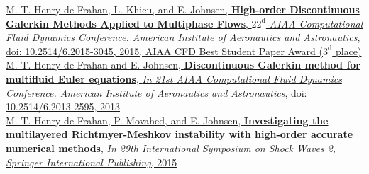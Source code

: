 \documentclass[11pt,letterpaper]{article}
\newcommand{\raisedrule}[2][0em]{\leaders\hbox{\rule[#1]{1pt}{#2}}\hfill}
\newcommand*{\sectionfont}{\Large\sffamily\mdseries\upshape}
\begin{document}
\href{http://arc.aiaa.org/doi/pdf/10.2514/6.2015-3045}{M. T. Henry de Frahan, L. Khieu, and E. Johnsen, \textbf{High-order Discontinuous Galerkin Methods Applied to Multiphase Flows}, \textit{$22^{\text{d}}$ AIAA Computational Fluid Dynamics Conference. American Institute of Aeronautics and Astronautics}, doi: 10.2514/6.2015-3045, 2015, AIAA CFD Best Student Paper Award ($3^{\text{d}}$ place)}\\[2ex]%
\href{http://arc.aiaa.org/doi/pdf/10.2514/6.2013-2595}{M. T. Henry de Frahan and E. Johnsen, \textbf{Discontinuous Galerkin method for multifluid Euler equations}, \textit{In 21st AIAA Computational Fluid Dynamics Conference. American Institute of Aeronautics and Astronautics}, doi: 10.2514/6.2013-2595, 2013}\\[2ex]%
\href{https://books.google.com/books?id=6GgnCgAAQBAJ&pg=PA1095&lr=&source=gbs_selected_pages&cad=2#v=onepage&q&f=false}{M. T. Henry de Frahan, P. Movahed, and E. Johnsen, \textbf{Investigating the multilayered Richtmyer-Meshkov instability with high-order accurate numerical methods}, \textit{In 29th International Symposium on Shock Waves 2, Springer International Publishing}, 2015}\\[3ex]%
%
%
%
%
\end{document}
